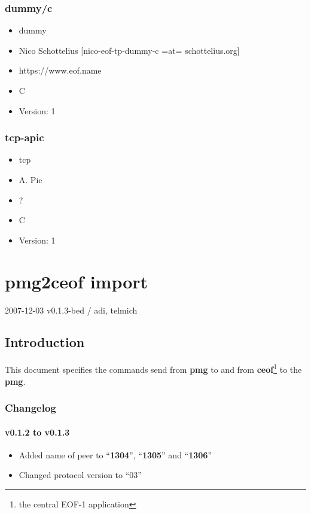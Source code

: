 \documentclass[12pt,a4paper]{book}
\begin{document}
\subsection{dummy/c}
\begin{itemize}
\item dummy
\item Nico Schottelius [nico-eof-tp-dummy-c =at= schottelius.org]
\item https://www.eof.name
\item C
\item Version: 1
\end{itemize}
\subsection{tcp-apic}
\begin{itemize}
\item tcp
\item A. Pic
\item ?
\item C
\item Version: 1
\end{itemize}


\chapter{pmg2ceof import}

2007-12-03 v0.1.3-bed / adi, telmich

\section{Introduction}
This document specifies the commands send from \textbf{pmg} to and from
\textbf{ceof}\footnote{the central EOF-1 application} to the \textbf{pmg}.

\subsection{Changelog}
\subsubsection{v0.1.2 to v0.1.3}
\begin{itemize}
\item Added name of peer to "`\textbf{1304}"', "`\textbf{1305}"' and "`\textbf{1306}"'
\item Changed protocol version to "`03"'
\end{itemize}
\end{document}
